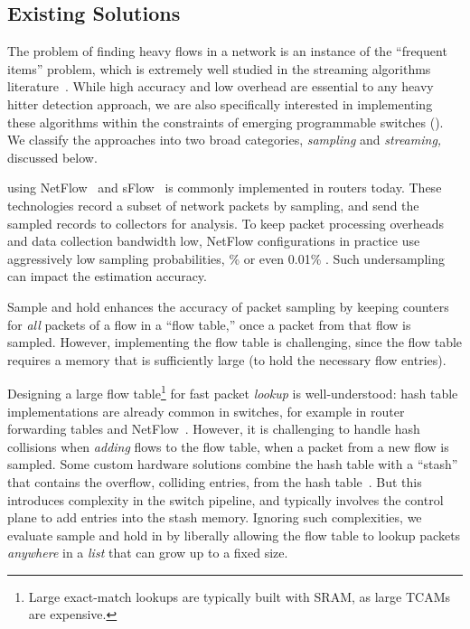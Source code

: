 \subsection{Existing Solutions}\label{sec:related}

The problem of finding heavy flows in a network is an instance of the ``frequent
items'' problem, which is extremely well studied in the streaming algorithms
literature~\cite{hh-cormode-survey}.
%
While high accuracy and low overhead are essential to any heavy hitter detection
approach, we are also specifically interested in implementing these algorithms
within the constraints of emerging programmable switches
().
%
We classify the approaches into two broad categories, {\em sampling} and {\em
  streaming,} discussed below.

 using NetFlow~\cite{cisco-netflow} and sFlow~\cite{sflow}
is commonly implemented in routers today. These technologies record a subset of
network packets by sampling, and send the sampled records to collectors for
analysis. To keep packet processing overheads and data collection bandwidth low,
NetFlow configurations in practice use aggressively low sampling probabilities,
\% or even 0.01\% \cite{sflow-sampling-rate, netflow-sampling-rate}. Such
undersampling can impact the estimation accuracy.

Sample and hold \cite{estan2002new} enhances the accuracy of packet sampling by
keeping counters for {\em all} packets of a flow in a ``flow table,'' once a
packet from that flow is sampled. However, implementing the flow table is
challenging, since the flow table requires a memory that is %
sufficiently large (to hold the necessary flow
entries).

Designing a large flow table\footnote{Large exact-match lookups are typically
  built with SRAM, as large TCAMs are expensive.} for fast packet {\em lookup}
is well-understood: hash table implementations are already common in switches,
for example in router forwarding tables and NetFlow~\cite{li2016flowradar}.
%
However, it is challenging to handle hash collisions when {\em adding} flows to
the flow table, when a packet from a new flow is sampled.
%
Some custom hardware solutions combine the hash table with a ``stash'' that
contains the overflow, \ie colliding entries, from the hash
table~\cite{sram-tcam-learning}. But this introduces complexity in the switch
pipeline, and typically involves the control plane to add entries into
the stash memory.
%
Ignoring such complexities, we evaluate sample and hold in 
by liberally allowing the flow table to lookup packets {\em anywhere} in a {\em
  list} that can grow up to a fixed size.

